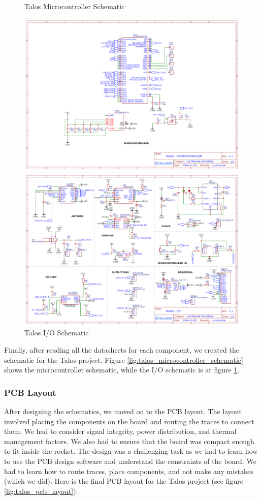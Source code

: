 \documentclass{article}
\begin{document}
\begin{figure}[h]
      \caption{Talos Microcontroller Schematic}
      \label{fig:talos_microcontroller_schematic}
      \centering
      \includegraphics[width=\textwidth]{Microcontroller.png}
      \caption{Talos I/O Schematic}
      \label{fig:talos_io_schematic}
      \centering
      \includegraphics[width=\textwidth]{IO.png}
\end{figure}
Finally, after reading all the datasheets for each component, we created the schematic for the Talos project. Figure \ref{fig:talos_microcontroller_schematic} shows the microcontroller schematic, while the I/O schematic is at figure \ref{fig:talos_io_schematic}.

\subsubsection{PCB Layout}
After designing the schematics, we moved on to the PCB layout. The layout involved placing the components on the board and routing the traces to connect them. We had to consider signal integrity, power distribution, and thermal management factors. We also had to ensure that the board was compact enough to fit inside the rocket. The design was a challenging task as we had to learn how to use the PCB design software and understand the constraints of the board. We had to learn how to route traces, place components, and not make any mistakes (which we did). Here is the final PCB layout for the Talos project (see figure \ref{fig:talos_pcb_layout}).
\end{document}
